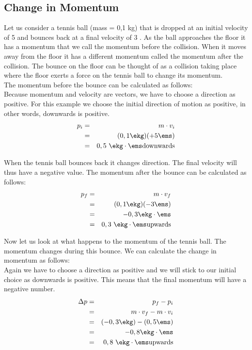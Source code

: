 \subsection{Change in Momentum}

Let us consider a tennis ball (mass = 0,1 kg) that is dropped at an initial velocity of 5 \ms and bounces back at a final velocity of 3 \ms. As the ball approaches the floor it has a momentum that we call the momentum before the collision. When it moves away from the floor it has a different momentum called the momentum after the collision. The bounce on the floor can be thought of as a collision taking place where the floor exerts a force on the tennis ball to change its momentum.\\



The momentum before the bounce can be calculated as follows:\\
Because momentum and velocity are vectors, we have to choose a direction as positive. For this example we choose the initial direction of motion as positive, in other words, downwards is positive.
\begin{eqnarray*}
p_{i} &=& m \cdot v_{i}\\
&=& (0,1 \ekg)(+5 \ems)\\
&=& 0,5\ \ekg\cdot\ems \mbox{downwards}
\end{eqnarray*}

When the tennis ball bounces back it changes direction. The final velocity will thus have a negative value. 
The momentum after the bounce can be calculated as follows:\\
\begin{eqnarray*}
p_{f} &=& m \cdot v_{f}\\
&=& (0,1 \ekg)(-3 \ems)\\
&=& -0,3 \ekg\cdot\ems\\
&=& 0,3\ \ekg\cdot\ems \mbox{upwards}
\end{eqnarray*}

Now let us look at what happens to the momentum of the tennis ball. The momentum changes during this bounce. We can calculate the change in momentum as follows:\\
Again we have to choose a direction as positive and we will stick to our initial choice as downwards is positive. This means that the final momentum will have a negative number. \\
\begin{eqnarray*}
\Delta p &=& p_{f} - p_{i}\\
&=& m \cdot v_{f} - m \cdot v_{i}\\
&=& (-0,3 \ekg) - (0,5 \ems)\\
&=& -0,8 \ekg\cdot\ems\\
&=& 0,8\ \ekg\cdot\ems \mbox{upwards}
\end{eqnarray*}

